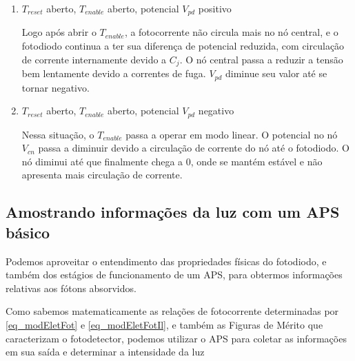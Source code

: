 \begin{enumerate}
\begin{equation}
    \label{eq_voutfinal}
    V_{out}(t) = V_0-\frac{I_{PH}}{C_j+C_{cn}}t - V_{GS\_buffer}
\end{equation}

Onde:

\begin{itemize}
    \item $V_{out}(t)$ \'e a tensão de saída do APS em determinado tempo $t$ [$V$]
    \item $V_{GS\_buffer}$ \'e a diferença de potencial entre $V_{cn}$ e $V_{out}(t)$, que considerando-se a ausência de efeitos de carga, e que $T_{buffer}$ esteja sempre na região de saturação no Estágio 2, é uma constante [$V$]
\end{itemize}

\item $T_{reset}$ aberto, $T_{enable}$ aberto, potencial \textit{$V_{pd}$} positivo

Logo ap\'os abrir o $T_{enable}$, a fotocorrente não circula mais no n\'o central, e o fotodiodo continua a ter sua diferença de potencial reduzida, com circulação de corrente internamente devido a $C_j$. O n\'o central passa a reduzir a tensão bem lentamente devido a correntes de fuga. \textit{$V_{pd}$} diminue seu valor at\'e se tornar negativo.

\item \textit{$T_{reset}$} aberto, \textit{$T_{enable}$} aberto, potencial \textit{$V_{pd}$} negativo

Nessa situação, o $T_{enable}$ passa a operar em modo linear. O potencial no n\'o $V_{cn}$ passa a diminuir devido a circulação de corrente do n\'o at\'e o fotodiodo. O nó diminui at\'e que finalmente chega a 0, onde se mant\'em estável e não apresenta mais circulação de corrente.

\end{enumerate}

\subsection{Amostrando informações da luz com um APS básico}
\label{secao_amostrando}

Podemos aproveitar o entendimento das propriedades f\'isicas do fotodiodo, e tamb\'em dos est\'agios de funcionamento de um APS, para obtermos informações relativas aos f\'otons absorvidos.

Como sabemos matematicamente as relações de fotocorrente determinadas por \autoref{eq_modEletFot} e \autoref{eq_modEletFotIl}, e tamb\'em as Figuras de M\'erito que caracterizam o fotodetector, podemos utilizar o APS para coletar as informações em sua sa\'ida e determinar a intensidade da luz

